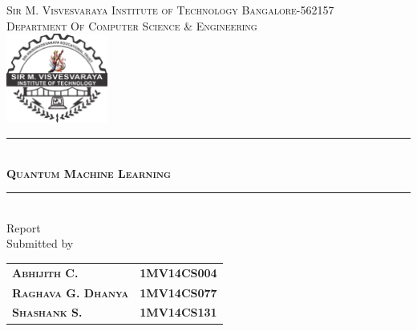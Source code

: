 

\begin{titlepage} %
	\newcommand{\HRule}{\rule{\linewidth}{0.5mm}} %

	\center %

	\LARGE{
        \textsc{ Sir M. Visvesvaraya Institute of Technology Bangalore-562157}\\[10pt] 
    }
	\LARGE{
		\textsc{Department Of Computer Science \& Engineering}\\[20pt]
	}
	\includegraphics[width=0.25\textwidth]{images/mvit.png}\\[10pt] 	


	\HRule\\[20pt]
	\textsc{\Huge \textbf{Quantum Machine Learning}}\\[10pt]
    \HRule\\[20pt]
	\Large{Report}\\[10pt]
	\Large{Submitted by}\\[20pt]
	\begin{tabular}{ l r }
		\textsc{\Large \textbf{Abhijith C.}}       & \Large \textbf{1MV14CS004} \\
		\textsc{\Large \textbf{Raghava G. Dhanya}} & \Large \textbf{1MV14CS077} \\
		\textsc{\Large \textbf{Shashank S.}}       & \Large \textbf{1MV14CS131}
	\end{tabular}\\[15pt]
\par

\end{titlepage}

